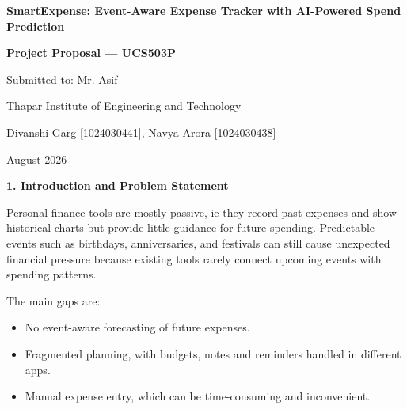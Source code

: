 \documentclass[12pt,a4paper]{article}\ref{}
\newcommand{\sectiontitle}[1]{%
    \vspace{8pt}
    \textbf{\large #1}
    \vspace{4pt}
}
\begin{document}

\begin{center}

{\Large \textbf{SmartExpense: Event-Aware Expense Tracker with AI-Powered Spend Prediction}}

\vspace{8pt}

{\large \textbf{Project Proposal — UCS503P}}

\vspace{12pt}

Submitted to: Mr. Asif

\vspace{4pt}

Thapar Institute of Engineering and Technology

\vspace{12pt}

Divanshi Garg [1024030441], Navya Arora [1024030438]

\vspace{4pt}

August 2026

\end{center}

\vspace{12pt}


\sectiontitle{1. Introduction and Problem Statement}

Personal finance tools are mostly passive, ie they record past expenses and show
historical charts but provide little guidance for future spending. Predictable events
such as birthdays, anniversaries, and festivals can still cause unexpected financial
pressure because existing tools rarely connect upcoming events with spending
patterns.

The main gaps are:

\begin{itemize}[leftmargin=1.5em]
    \item No event-aware forecasting of future expenses.
    \item Fragmented planning, with budgets, notes and reminders handled in different apps.
    \item Manual expense entry, which can be time-consuming and inconvenient.
\end{itemize}
\end{document}
